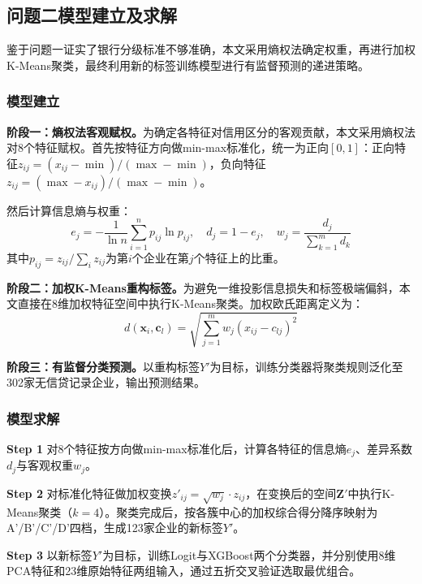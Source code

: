 \documentclass[12pt,a4paper,AutoFakeBold=2]{ctexart}
\newcommand{\step}[1]{\par\noindent\textbf{Step #1}\quad}
\begin{document}
\subsection{问题二模型建立及求解}

鉴于问题一证实了银行分级标准不够准确，本文采用熵权法确定权重，再进行加权K-Means聚类，最终利用新的标签训练模型进行有监督预测的递进策略。

\subsubsection{模型建立}

\textbf{阶段一：熵权法客观赋权。}为确定各特征对信用区分的客观贡献，本文采用熵权法对8个特征赋权。首先按特征方向做min-max标准化，统一为正向$[0,1]$：正向特征$z_{ij}=(x_{ij}-\min)/(\max-\min)$，负向特征$z_{ij}=(\max-x_{ij})/(\max-\min)$。

然后计算信息熵与权重：
\begin{equation}
e_j = -\frac{1}{\ln n}\sum_{i=1}^{n}p_{ij}\ln p_{ij}, \quad d_j = 1 - e_j, \quad w_j = \frac{d_j}{\sum_{k=1}^{m}d_k}
\label{eq:entropy}
\end{equation}
其中$p_{ij}=z_{ij}/\sum_i z_{ij}$为第$i$个企业在第$j$个特征上的比重。

\textbf{阶段二：加权K-Means重构标签。}为避免一维投影信息损失和标签极端偏斜，本文直接在8维加权特征空间中执行K-Means聚类。加权欧氏距离定义为：
\begin{equation}
d(\mathbf{x}_i, \mathbf{c}_l) = \sqrt{\sum_{j=1}^{m}w_j(x_{ij} - c_{lj})^2}
\label{eq:wkmeans}
\end{equation}

\textbf{阶段三：有监督分类预测。}以重构标签$Y'$为目标，训练分类器将聚类规则泛化至302家无信贷记录企业，输出预测结果。

\subsubsection{模型求解}

\step{1} 对8个特征按方向做min-max标准化后，计算各特征的信息熵$e_j$、差异系数$d_j$与客观权重$w_j$。

\step{2} 对标准化特征做加权变换$z'_{ij}=\sqrt{w_j}\cdot z_{ij}$，在变换后的空间$\mathbf{Z}'$中执行K-Means聚类（$k=4$）。聚类完成后，按各簇中心的加权综合得分降序映射为A'/B'/C'/D'四档，生成123家企业的新标签$Y'$。

\step{3} 以新标签$Y'$为目标，训练Logit与XGBoost两个分类器，并分别使用8维PCA特征和23维原始特征两组输入，通过五折交叉验证选取最优组合。
\end{document}
